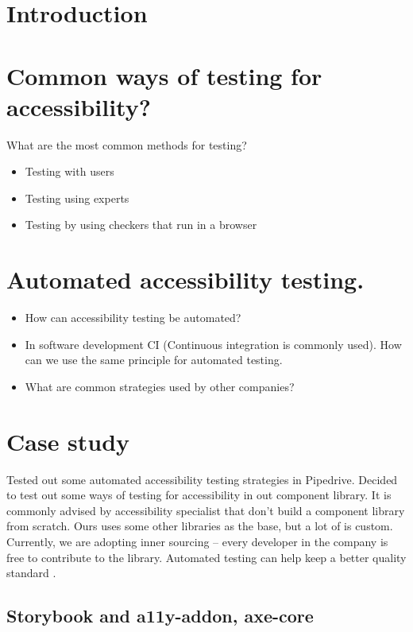 \documentclass{master_thesis}
\begin{document}

\section{Introduction}


\section{Common ways of testing for accessibility?}
What are the most common methods for testing? \\
\begin{itemize}
	\item Testing with users
	\item Testing using experts
	\item Testing by using checkers that run in a browser
\end{itemize}

\section{Automated accessibility testing.}

\begin{itemize}
	\item How can accessibility testing be automated?
	\item In software development CI (Continuous integration is commonly used). How can we use the same principle for automated testing.
	\item What are common strategies used by other companies?
\end{itemize}

\section{Case study}

Tested out some automated accessibility testing strategies in Pipedrive.
Decided to test out some ways of testing for accessibility in out component library. It is commonly advised by accessibility specialist that don't build a component library from scratch. Ours uses some other libraries as the base, but a lot of is custom. Currently, we are adopting inner sourcing – every developer in the company is free to contribute to the library. Automated testing can help keep a better quality standard \citep{Sane2021}.

\subsection{Storybook and a11y-addon, axe-core}
\end{document}
